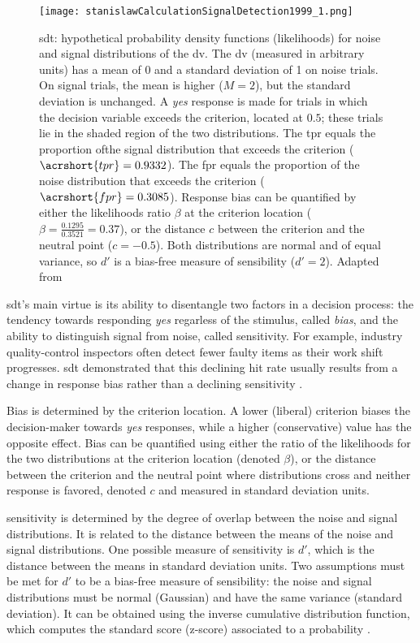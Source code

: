 \begin{figure}[ht]
    \centering
    \texttt{[image: stanislawCalculationSignalDetection1999\_1.png]}
    \caption[\acrlong{sdt}: graphical formalism]{\acrlong{sdt}: hypothetical probability density functions (likelihoods) for noise and signal distributions of the \acrlong{dv}. The \acrshort{dv} (measured in arbitrary units) has a mean of 0 and a standard deviation of 1 on noise trials. On signal trials, the mean is higher ($M = 2$), but the standard deviation is unchanged. A \textit{yes} response is made for trials in which the decision variable exceeds the criterion, located at $0.5$; these trials lie in the shaded region of the two distributions. The \acrlong{tpr} equals the proportion ofthe signal distribution that exceeds the criterion ($\acrshort{tpr} = 0.9332$). The \acrlong{fpr} equals the proportion of the noise distribution that exceeds the criterion ($\acrshort{fpr} = 0.3085$). Response bias can be quantified by either the likelihoods ratio $\beta$ at the criterion location ($\beta = \frac{0.1295}{0.3521} = 0.37$), or the distance $c$ between the criterion and the neutral point ($c = -0.5$). Both distributions are normal and of equal variance, so $d'$ is a bias-free measure of sensibility ($d'=2$). Adapted from \cite{myersPracticalIntroductionUsing2022}}
    \label{figure:sdt}
\end{figure}

\acrlong{sdt}'s main virtue is its ability to disentangle two factors in a decision process: the tendency towards responding \textit{yes} regarless of the stimulus, called \textit{bias}, and the ability to distinguish signal from noise, called \gls{sensitivity}. For example, industry quality-control inspectors often detect fewer faulty items as their work shift progresses. \Acrshort{sdt} demonstrated that this declining hit rate usually results from a change in response bias rather than a declining \gls{sensitivity} .

Bias is determined by the criterion location. A lower (liberal) criterion biases the decision-maker towards \textit{yes} responses, while a higher (conservative) value has the opposite effect. Bias can be quantified using either the ratio of the likelihoods for the two distributions at the criterion location (denoted $\beta$), or the distance between the criterion and the neutral point where distributions cross and neither response is favored, denoted $c$ and measured in standard deviation units.

\Gls{sensitivity} is determined by the degree of overlap between the noise and signal distributions. It is related to the distance between the means of the noise and signal distributions. One possible measure of \gls{sensitivity} is $d'$, which is the distance between the means in standard deviation units. Two assumptions must be met for $d'$ to be a bias-free measure of sensibility: the noise and signal distributions must be normal (Gaussian) and have the same variance (standard deviation). It can be obtained using the inverse cumulative distribution function, which computes the standard score (z-score) associated to a probability \cite{stanislawCalculationSignalDetection1999}.

